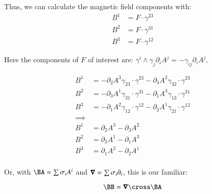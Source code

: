 Thus, we can calculate the magnetic field components with:
\begin{align}
B^1 &= F \cdot \gamma^{23} \\
B^2 &= F \cdot \gamma^{31} \\
B^3 &= F \cdot \gamma^{12}
\end{align}

Here the components of $F$ of interest are: $\gamma^i \wedge \gamma_j \partial_i A^j = -\gamma_{ij} \partial_i A^j$.

\begin{align*}
B^1 &= - \partial_2 A^3 \gamma_{23} \cdot \gamma^{23} - \partial_3 A^2 \gamma_{32} \cdot \gamma^{23} \\
B^2 &= - \partial_3 A^1 \gamma_{31} \cdot \gamma^{31} - \partial_1 A^3 \gamma_{13} \cdot \gamma^{31} \\
B^3 &= - \partial_1 A^2 \gamma_{12} \cdot \gamma^{12} - \partial_2 A^1 \gamma_{21} \cdot \gamma^{12} \\
\implies \\
B^1 &= \partial_2 A^3 - \partial_3 A^2 \\
B^2 &= \partial_3 A^1 - \partial_1 A^3 \\
B^3 &= \partial_1 A^2 - \partial_2 A^1 \\
\end{align*}

Or, with $\BA = \sum \sigma_i A^i$ and $\boldsymbol{\nabla} = \sum \sigma_i \partial_i$, this is our familiar:

\begin{equation}
\BB = \spacegrad \cross \BA
\end{equation}
